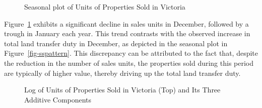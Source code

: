 \documentclass[
  11pt,
  a4paper,
]{article}
\begin{document}
\begin{figure}


\caption{\label{fig-salessspattern}Seasonal plot of Units of Properties
Sold in Victoria}

\end{figure}%

Figure~\ref{fig-salessspattern} exhibits a significant decline in sales
units in December, followed by a trough in January each year. This trend
contrasts with the observed increase in total land transfer duty in
December, as depicted in the seasonal plot in
Figure~\ref{fig-sspattern}. This discrepancy can be attributed to the
fact that, despite the reduction in the number of sales units, the
properties sold during this period are typically of higher value,
thereby driving up the total land transfer duty.

\begin{figure}


\caption{\label{fig-salesdcmp}Log of Units of Properties Sold in
Victoria (Top) and Its Three Additive Components}

\end{figure}%
\end{document}
